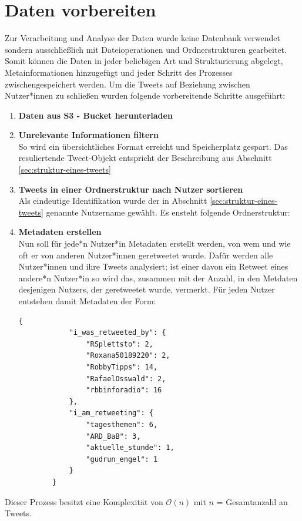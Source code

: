 \section{Daten vorbereiten}
\label{sec:daten-vorbereiten}
Zur Verarbeitung und Analyse der Daten wurde keine Datenbank verwendet sondern ausschließlich mit Dateioperationen und Ordnerstrukturen gearbeitet. Somit können die Daten in jeder beliebigen Art und Strukturierung abgelegt, Metainformationen hinzugefügt und jeder Schritt des Prozesses zwischengespeichert werden. 
Um die Tweets auf Beziehung zwischen Nutzer*innen zu schließen wurden folgende vorbereitende Schritte ausgeführt:
\begin{enumerate}
	\item \textbf{Daten aus \gls{S3 - Bucket} herunterladen}
	\item \textbf{Unrelevante Informationen filtern}\\  So wird ein übersichtliches Format erreicht und Speicherplatz gespart. Das resuliertende Tweet-Objekt entspricht der Beschreibung aus Abschnitt \ref{sec:struktur-eines-tweets}
	\item \textbf{Tweets in einer Ordnerstruktur nach Nutzer sortieren\\} Als eindeutige Identifikation wurde der in Abschnitt \ref{sec:struktur-eines-tweets} genannte Nutzername gewählt. Es ensteht folgende Ordnerstruktur: \\

	\item \textbf{Metadaten erstellen}\\
	Nun soll für jede*n Nutzer*in Metadaten erstellt werden, von wem und wie oft er von anderen Nutzer*innen \gls{geretweetet} wurde.
	Dafür werden alle Nutzer*innen und ihre Tweets analysiert; ist einer davon ein \gls{Retweet} eines andere*n Nutzer*in so wird das, zusammen mit der Anzahl, in den Metdaten desjenigen Nutzers, der \gls{geretweetet} wurde, vermerkt. 
	Für jeden Nutzer entstehen damit Metadaten der Form:
	
	\begin{lstlisting}[caption={Metdaten des Nutzer: "`tagesschau"'}]
		{
			"i_was_retweeted_by": {
				"RSplettsto": 2,
				"Roxana50189220": 2,
				"RobbyTipps": 14,
				"RafaelOsswald": 2,
				"rbbinforadio": 16
			},
			"i_am_retweeting": {
				"tagesthemen": 6,
				"ARD_BaB": 3,
				"aktuelle_stunde": 1,
				"gudrun_engel": 1
			}
		}
	\end{lstlisting}
\end{enumerate}
Dieser Prozess besitzt eine Komplexität von $\mathcal{O}(n)$ mit $n$ = Gesamtanzahl an Tweets. 
